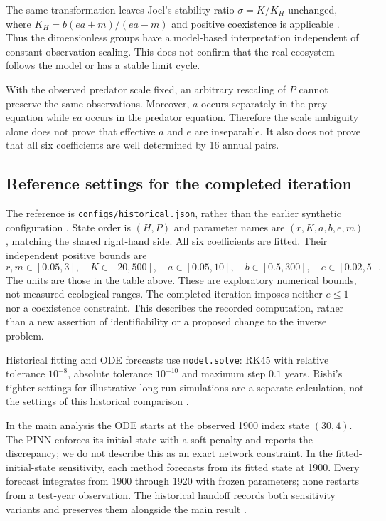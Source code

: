 The same transformation leaves Joel's stability ratio $\sigma=K/K_H$ unchanged,
where $K_H=b(ea+m)/(ea-m)$ and positive coexistence is applicable
\cite{arnav_joel2026}. Thus the dimensionless groups have a model-based
interpretation independent of constant observation scaling. This does not confirm
that the real ecosystem follows the model or has a stable limit cycle.

With the observed predator scale fixed, an arbitrary rescaling of $P$ cannot
preserve the same observations. Moreover, $a$ occurs separately in the prey
equation while $ea$ occurs in the predator equation. Therefore the scale ambiguity
alone does not prove that effective $a$ and $e$ are inseparable. It also does not
prove that all six coefficients are well determined by 16 annual pairs.

\subsection{Reference settings for the completed iteration}
The reference is \texttt{configs/historical.json}, rather than the earlier
synthetic configuration \cite{arnav_historical2026}. State order is $(H,P)$ and
parameter names are $(r,K,a,b,e,m)$, matching the shared right-hand side.
All six coefficients are fitted. Their independent positive bounds are
\[
r,m\in[0.05,3],\quad K\in[20,500],\quad a\in[0.05,10],\quad
b\in[0.5,300],\quad e\in[0.02,5].
\]
The units are those in the table above. These are exploratory numerical bounds,
not measured ecological ranges. The completed iteration imposes neither $e\leq1$
nor a coexistence constraint. This describes the recorded computation, rather
than a new assertion of identifiability or a proposed change to the inverse problem.

Historical fitting and ODE forecasts use \texttt{model.solve}: RK45 with relative
tolerance $10^{-8}$, absolute tolerance $10^{-10}$ and maximum step $0.1$ years.
Rishi's tighter settings for illustrative long-run simulations are a separate
calculation, not the settings of this historical comparison
\cite{arnav_historical2026,arnav_rishi2026}.

In the main analysis the ODE starts at the observed 1900 index state $(30,4)$.
The PINN enforces its initial state with a soft penalty and reports the discrepancy;
we do not describe this as an exact network constraint. In the fitted-initial-state
sensitivity, each method forecasts from its fitted state at 1900. Every forecast
integrates from 1900 through 1920 with frozen parameters; none restarts from a
test-year observation. The historical handoff records both sensitivity variants
and preserves them alongside the main result \cite{arnav_historical2026}.

